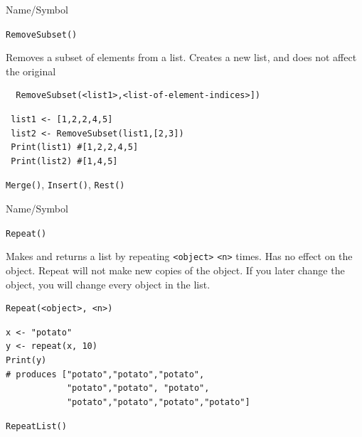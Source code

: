 \begin{desc}{Name/Symbol}
\item[Name/Symbol]	\verb+RemoveSubset()+

\item[Description] Removes a subset of elements from a list. Creates
a new list, and does not affect the original

\item[Usage]
\begin{verbatim}
  RemoveSubset(<list1>,<list-of-element-indices>])
\end{verbatim}

\item[Example]	
\begin{verbatim}
 list1 <- [1,2,2,4,5]
 list2 <- RemoveSubset(list1,[2,3])
 Print(list1) #[1,2,2,4,5]
 Print(list2) #[1,4,5]
\end{verbatim}

\item[See Also]	
\verb+Merge()+, \verb+Insert()+, \verb+Rest()+
\end{desc}


\begin{desc}{Name/Symbol}
\item[Name/Symbol] 	\verb+Repeat()+

\item[Description] 	Makes and returns a list by repeating \verb+<object>+ \verb+<n>+ times. 
		Has no effect on the object. Repeat will not make new copies 
		of the object. If you later change the object, 
		you will change every object in the list.

\item[Usage]       	
\begin{verbatim}
Repeat(<object>, <n>)
\end{verbatim}
	    	
\item[Example]     	
\begin{verbatim}
x <- "potato"
y <- repeat(x, 10)
Print(y)
# produces ["potato","potato","potato",
            "potato","potato", "potato",
            "potato","potato","potato","potato"]
\end{verbatim}
	     	     
\item[See Also]    	\verb+RepeatList()+
\end{desc}

